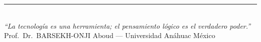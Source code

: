 \documentclass[12pt,a4paper]{article}
\begin{document}
\vfill
\begin{center}
  {\color{anahuacblue}\rule{0.5\linewidth}{0.8pt}}\\[0.2cm]
  {\small\itshape ``La tecnología es una herramienta; el pensamiento lógico es el verdadero poder.''}\\
  {\small Prof.\ Dr.\ BARSEKH-ONJI Aboud --- Universidad Anáhuac México}
\end{center}
\end{document}
